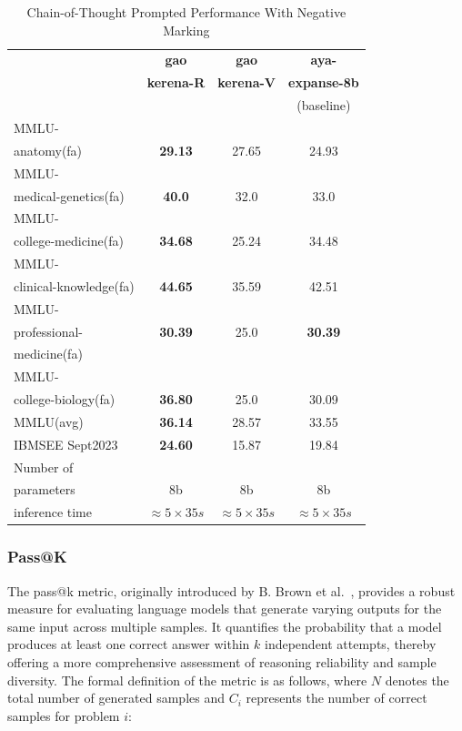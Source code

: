 \documentclass[conference]{IEEEtran}
\begin{document}
	\begin{table}[ht]
		\centering
		\caption{Chain-of-Thought Prompted Performance With Negative Marking}
		\begin{tabular}{|l|c|c|c|}  
			\hline
			\textbf{} & \textbf{gao} & \textbf{gao} & \textbf{aya-} \\ 
			& \textbf{kerena-R} &  \textbf{kerena-V} & \textbf{expanse-8b} \\
			&   & &(baseline)  \\ \hline
			MMLU- &  &  &  \\ 
			anatomy(fa)  & \textbf{29.13} & 27.65  & 24.93  \\ \hline
			MMLU- &    &  &  \\
			medical-genetics(fa) & \textbf{40.0}  & 32.0  & 33.0  \\ \hline
			MMLU- &  &    &  \\
			college-medicine(fa) & \textbf{34.68}  & 25.24  & 34.48  \\ \hline
			MMLU- &    &  &  \\
			clinical-knowledge(fa)& \textbf{44.65} & 35.59  & 42.51  \\ \hline
			MMLU- &  &  &  \\
			professional-& \textbf{30.39} & 25.0 & \textbf{30.39}   \\
                        medicine(fa)& &  &  \\ \hline
			MMLU- &  &  &  \\
			college-biology(fa)& \textbf{36.80} & 25.0  & 30.09  \\ \hline
			MMLU(avg) & \textbf{36.14} & 28.57  & 33.55  \\ \hline
			IBMSEE Sept2023 & \textbf{24.60}  & 15.87 & 19.84   \\ \hline
			Number of&  &  &  \\
			parameters & 8b & 8b & 8b \\ \hline
			inference time & $\approx 5 \times 35s$ & $\approx 5 \times 35s$ & $\approx 5 \times 35s$ \\  \hline
		\end{tabular}
		\label{tab:med_reasoning_capabillities_NM_comparison}
	\end{table}
           
           \subsubsection{Pass@K}
The pass@k metric, originally introduced by B. Brown et al.~\cite{b20}, 
provides a robust measure for evaluating language models that generate varying outputs for the same input across multiple samples. It quantifies the probability that a model produces at least one correct answer within \(k\) independent attempts, thereby offering a more comprehensive assessment of reasoning reliability and sample diversity. The formal definition of the metric is as follows, where \(N\) denotes the total number of generated samples and \(C_i\) represents the number of correct samples for problem \(i\):
\end{document}
